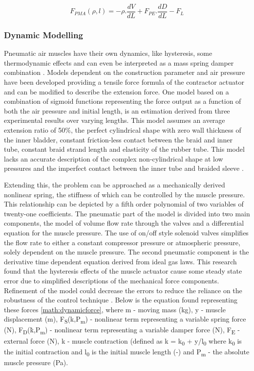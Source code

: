 \documentclass[11pt,a4paper]{article}
\begin{document}
\begin{equation}
F_{PMA}(\rho, l) = -\rho.\frac{dV}{dL}+F_{PE}.\frac{dD}{dL}-F_L
\label{math:staticforce}
\end{equation}

\subsubsection{Dynamic Modelling}
\label{sub:dynamic_modelling}
Pneumatic air muscles have their own dynamics, like hysteresis, some thermodynamic effects and can even be interpreted as a mass spring damper combination \cite{martens_boblan_2017}. Models dependent on the construction parameter and air pressure have been developed providing a tensile force formula of the contractor actuator and can be modified to describe the extension force. One model based on a combination of sigmoid functions representing the force output as a function of both the air pressure and initial length, is an estimation derived from three experimental results over varying lengths. This model assumes an average extension ratio of 50\%, the perfect cylindrical shape with zero wall thickness of the inner bladder, constant friction-less contact between the braid and inner tube, constant braid strand length and elasticity of the rubber tube. This model lacks an accurate description of the complex non-cylindrical shape at low pressures and the imperfect contact between the inner tube and braided sleeve \cite{al-ibadi_nefti-meziani_davis_2018}. \newline

Extending this, the problem can be approached as a mechanically derived nonlinear spring, the stiffness of which can be controlled by the muscle pressure. This relationship can be depicted by a fifth order polynomial of two variables of twenty-one coefficients. The pneumatic part of the model is divided into two main components, the model of volume flow rate through the valves and a differential equation for the muscle pressure. The use of on/off style solenoid valves simplifies the flow rate to either a constant compressor pressure or atmospheric pressure, solely dependent on the muscle pressure. The second pneumatic component is the derivative time dependent equation derived from ideal gas laws. This research found that the hysteresis effects of the muscle actuator cause some steady state error due to simplified descriptions of the mechanical force components. Refinement of the model could decrease the errors to reduce the reliance on the robustness of the control technique \cite{hosovsky_2012}. Below is the equation found representing these forces \cref{math:dynamicforce}, where m - moving mass (kg), y - muscle displacement (m), F\textsubscript{S}(k,P\textsubscript{m}) - nonlinear term representing a variable spring force (N), F\textsubscript{D}(\.{k},P\textsubscript{m}) - nonlinear term representing a variable damper force (N), F\textsubscript{E} - external force (N), k - muscle contraction (defined as k = k\textsubscript{0} + y/l\textsubscript{0} where k\textsubscript{0} is the initial contraction and l\textsubscript{0} is the initial muscle length (-) and P\textsubscript{m} - the absolute muscle pressure (Pa).
\end{document}

